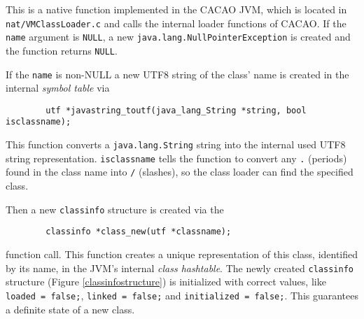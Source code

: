 \begingroup
{}
This is a native function implemented in the CACAO JVM, which is
located in \texttt{nat/VMClassLoader.c} and calls the internal loader
functions of CACAO. If the \texttt{name} argument is \texttt{NULL}, a
new \texttt{java.lang.NullPointerException} is created and the
function returns \texttt{NULL}.

\endgroup

If the \texttt{name} is non-NULL a new UTF8 string of the class' name
is created in the internal \textit{symbol table} via

\begin{verbatim}
        utf *javastring_toutf(java_lang_String *string, bool isclassname);
\end{verbatim}

This function converts a \texttt{java.lang.String} string into the
internal used UTF8 string representation. \texttt{isclassname} tells
the function to convert any \texttt{.} (periods) found in the class
name into \texttt{/} (slashes), so the class loader can find the
specified class.

Then a new \texttt{classinfo} structure is created via the

\begin{verbatim}
        classinfo *class_new(utf *classname);
\end{verbatim}

function call. This function creates a unique representation of this
class, identified by its name, in the JVM's internal \textit{class
hashtable}. The newly created \texttt{classinfo} structure (Figure
\ref{classinfostructure}) is initialized with correct values, like
\texttt{loaded = false;}, \texttt{linked = false;} and
\texttt{initialized = false;}. This guarantees a definite state of a
new class.


